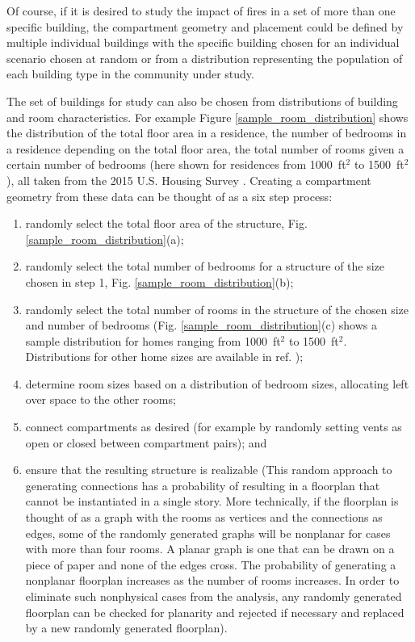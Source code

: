 \documentclass[12pt,twoside]{book}
\begin{document}
Of course, if it is desired to study the impact of fires in a set of more than one specific building, the compartment geometry and placement could be defined by multiple individual buildings with the specific building chosen for an individual scenario chosen at random or from a distribution representing the population of each building type in the community under study.

The set of buildings for study can also be chosen from distributions of building and room characteristics. For example Figure \ref{sample_room_distribution} shows the distribution of the total floor area in a residence, the number of bedrooms in a residence depending on the total floor area, the total number of rooms given a certain number of bedrooms (here shown for residences from 1000~ft$^2$ to 1500~ft$^2$), all taken from the 2015 U.S. Housing Survey \cite{AHS2015}. Creating a compartment geometry from these data can be thought of as a six step process:

\begin{enumerate}
    \item randomly select the total floor area of the structure, Fig. \ref{sample_room_distribution}(a);
    \item randomly select the total number of bedrooms for a structure of the size chosen in step 1, Fig. \ref{sample_room_distribution}(b);
    \item randomly select the total number of rooms in the structure of the chosen size and number of bedrooms (Fig. \ref{sample_room_distribution}(c) shows a sample distribution for homes ranging from 1000~ft$^2$ to 1500~ft$^2$. Distributions for other home sizes are available in ref. \cite{AHS2015});
    \item determine room sizes based on a distribution of bedroom sizes, allocating left over space to the other rooms;
    \item connect compartments as desired (for example by randomly setting vents as open or closed between compartment pairs); and
    \item ensure that the resulting structure is realizable (This random approach to generating connections has a probability of resulting in a floorplan that cannot be instantiated in a single story. More technically, if the floorplan is thought of as a graph with the rooms as vertices and the connections as edges, some of the randomly generated graphs will be nonplanar for cases with more than four rooms. A planar graph is one that can be drawn on a piece of paper and none of the edges cross. The probability of generating a nonplanar floorplan increases as the number of rooms increases. In order to eliminate such nonphysical cases from the analysis, any randomly generated floorplan can be checked for planarity and rejected if necessary and replaced by a new randomly generated floorplan).
\end{enumerate}
\end{document}
